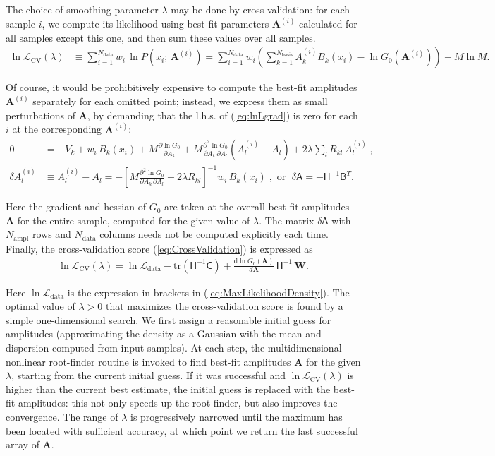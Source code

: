 \documentclass[12pt]{article}
\renewcommand{\d}{\mathrm{d}}
\newcommand{\D}{\partial}
\newcommand{\bA}{\boldsymbol{A}}
\begin{document}
The choice of smoothing parameter $\lambda$ may be done by cross-validation: for each sample $i$, we compute its likelihood using best-fit parameters $\bA^{(i)}$ calculated for all samples except this one, and then sum these values over all samples. 
\begin{align}  \label{eq:CrossValidation}
\ln\mathcal{L}_\mathrm{CV}(\lambda) &\equiv \sum_{i=1}^{N_\mathrm{data}} w_i \, \ln P(x_i;\, \bA^{(i)}) =
\sum_{i=1}^{N_\mathrm{data}} w_i \left(\sum_{k=1}^{N_\mathrm{basis}} A_k^{(i)} B_k(x_i) - \ln G_0(\bA^{(i)}) \right) + M\ln M.
\end{align}

Of course, it would be prohibitively expensive to compute the best-fit amplitudes $\bA^{(i)}$ separately for each omitted point; instead, we express them as small perturbations of $\bA$, by demanding that the l.h.s. of (\ref{eq:lnLgrad}) is zero for each $i$ at the corresponding $\bA^{(i)}$:
\begin{align*}
0 &= -V_k + w_i\,B_k(x_i) + M \frac{\D \ln G_0}{\D A_k} + M \frac{\D ^2 \ln G_0}{\D A_k\,\D A_l}(A_l^{(i)}-A_l) + 2\lambda \sum_l R_{kl}\,A_l^{(i)} \;, \\
\delta A^{(i)}_l &\equiv A^{(i)}_l - A_l = - \left[ M \frac{\D ^2 \ln G_0}{\D A_k\,\D A_l} + 2\lambda R_{kl} \right]^{-1} w_i\,B_k(x_i) \;,\mbox{ or }\;
\delta \mathsf{A} = -\mathsf{H}^{-1} \mathsf{B}^T .
\end{align*}

Here the gradient and hessian of $G_0$ are taken at the overall best-fit amplitudes $\bA$ for the entire sample, computed for the given value of $\lambda$. The matrix $\delta \mathsf{A}$ with $N_\mathrm{ampl}$ rows and $N_\mathrm{data}$ columns needs not be computed explicitly each time. Finally, the cross-validation score (\ref{eq:CrossValidation}) is expressed as
\begin{align}  \label{eq:CrossValidation2}
\ln\mathcal{L}_\mathrm{CV}(\lambda) = \ln\mathcal{L}_\mathrm{data}
- \mathrm{tr}(\mathsf{H}^{-1}\mathsf{C}) + \frac{\d\ln G_0(\bA)}{d\bA}\, \mathsf{H}^{-1}\, \boldsymbol{W} .
\end{align}

Here $\ln\mathcal{L}_\mathrm{data}$ is the expression in brackets in (\ref{eq:MaxLikelihoodDensity}). The optimal value of $\lambda>0$ that maximizes the cross-validation score is found by a simple one-dimensional search. We first assign a reasonable initial guess for amplitudes (approximating the density as a Gaussian with the mean and dispersion computed from input samples). At each step, the multidimensional nonlinear root-finder routine is invoked to find best-fit amplitudes $\bA$ for the given $\lambda$, starting from the current initial guess. If it was successful and $\ln\mathcal{L}_\mathrm{CV}(\lambda)$ is higher than the current best estimate, the initial guess is replaced with the best-fit amplitudes: this not only speeds up the root-finder, but also improves the convergence. The range of $\lambda$ is progressively narrowed until the maximum has been located with sufficient accuracy, at which point we return the last successful array of $\bA$. 
\end{document}
